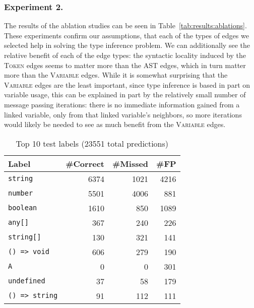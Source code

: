 \subsubsection{Experiment 2.}
The results of the ablation studies can be seen in Table~\ref{tab:results:ablations}.
These experiments confirm our assumptions, that each of the types of edges we selected help in solving the type inference problem.
We can additionally see the relative benefit of each of the edge types: the syntactic locality induced by the \textsc{Token} edges seems to matter more than the AST edges, which in turn matter more than the \textsc{Variable} edges.
While it is somewhat surprising that the \textsc{Variable} edges are the least important, since type inference is based in part on variable usage, this can be explained in part by the relatively small number of message passing iterations: there is no immediate information gained from a linked variable, only from that linked variable's neighbors, so more iterations would likely be needed to see as much benefit from the \textsc{Variable} edges.

\begin{table}
  \centering
  {\renewcommand{\arraystretch}{1.3}%
  \begin{tabular}{lrrr}
    \textbf{Label} & \textbf{\#Correct} & \textbf{\#Missed} & \textbf{\#FP} \\
    \hline
    \texttt{string} & 6374 & 1021 & 4216 \\
    \texttt{number} & 5501 & 4006 & 881 \\
    \texttt{boolean} & 1610 & 850 & 1089 \\
    \texttt{any[]} & 367 & 240 & 226 \\
    \texttt{string[]} & 130 & 321 & 141 \\
    \texttt{() => void} & 606 & 279 & 190 \\
    \texttt{A}  & 0 & 0 & 301 \\
    \texttt{undefined} & 37 & 58 & 179 \\
    \texttt{() => string} & 91 & 112 & 111
  \end{tabular}
   }
  \caption{Top 10 test labels (23551 total predictions)}\label{tab:test-fps}
\end{table}


